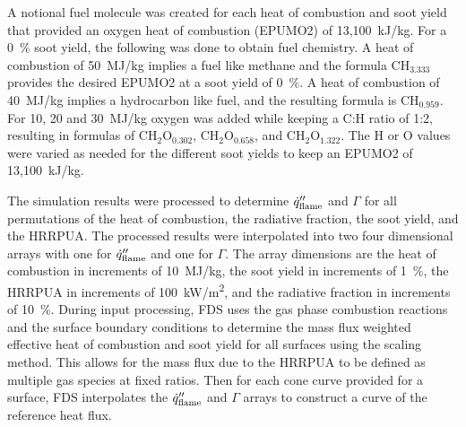 A notional fuel molecule was created for each heat of combustion and soot yield that provided an oxygen heat of combustion (EPUMO2) of 13,100~\unit{kJ/kg}. For a 0~\% soot yield, the following was done to obtain fuel chemistry. A heat of combustion of 50~\unit{MJ/kg} implies a fuel like methane and the formula CH$_{3.333}$ provides the desired EPUMO2 at a soot yield of 0~\%. A heat of combustion of 40~\unit{MJ/kg} implies a hydrocarbon like fuel, and the resulting formula is CH$_{0.959}$. For 10, 20 and 30~\unit{MJ/kg} oxygen was added while keeping a C:H ratio of 1:2, resulting in formulas of CH$_{2}$O$_{0.302}$, CH$_{2}$O$_{0.658}$, and CH$_{2}$O$_{1.322}$. The H or O values were varied as needed for the different soot yields to keep an EPUMO2 of 13,100~\unit{kJ/kg}.

The simulation results were processed to determine $\dot{q}_{\rm flame}''$ and $\Gamma$ for all permutations of the heat of combustion, the radiative fraction, the soot yield, and the HRRPUA. The processed results were interpolated into two four dimensional arrays with one for $\dot{q}_{\rm flame}''$ and one for $\Gamma$. The array dimensions are the heat of combustion in increments of 10~MJ/kg, the soot yield in increments of 1~\%, the HRRPUA in increments of 100~\unit{kW/m^2}, and the radiative fraction in increments of 10~\%. During input processing, FDS uses the gas phase combustion reactions and the surface boundary conditions to determine the mass flux weighted effective heat of combustion and soot yield for all surfaces using the scaling method. This allows for the mass flux due to the HRRPUA to be defined as multiple gas species at fixed ratios. Then for each cone curve provided for a surface, FDS interpolates the $\dot{q}_{\rm flame}''$ and $\Gamma$ arrays to construct a curve of the reference heat flux.

